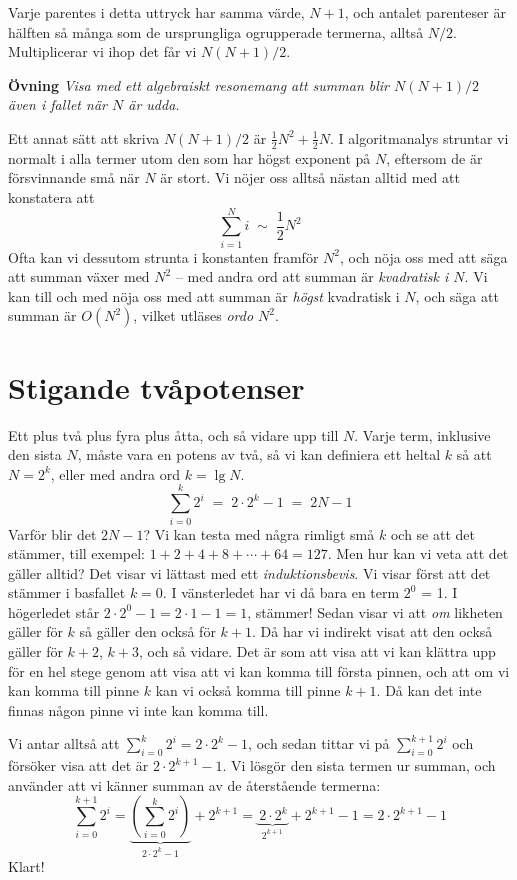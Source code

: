 \documentclass[a4paper]{article}
\begin{document}
Varje parentes i detta uttryck har samma värde, \(N+1\), och antalet parenteser är
hälften så många som de ursprungliga ogrupperade termerna, alltså \(N/2\). Multiplicerar vi ihop
det får vi \(N(N+1)/2\).

\smallskip

\noindent \textbf{Övning} \emph{Visa med ett algebraiskt resonemang att summan blir
\(N(N+1)/2\) även i fallet när \(N\) är udda.}

\smallskip

Ett annat sätt att skriva \(N(N+1)/2\) är \(\frac{1}{2}N^2 + \frac{1}{2}N\). I
algoritmanalys struntar vi normalt i alla termer utom den som har högst exponent
på \(N\), eftersom de är försvinnande små när \(N\) är stort. Vi nöjer oss
alltså nästan alltid med att konstatera att
\[\sum_{i=1}^N i \; \sim\; \frac{1}{2}N^2\]
Ofta kan vi dessutom strunta i konstanten framför \(N^2\), och nöja oss med att säga att summan
växer med \(N^2\) – med andra ord att summan är \emph{kvadratisk i \(N\)}. Vi kan till och med
nöja oss med att summan är \emph{högst} kvadratisk i \(N\), och säga att summan är
\(O(N^2)\), vilket utläses \emph{ordo \(N^2\)}.

\section*{Stigande tvåpotenser}
\label{sec:orge12075c}

Ett plus två plus fyra plus åtta, och så vidare upp till \(N\). Varje term,
inklusive den sista \(N\), måste vara en
potens av två, så vi kan definiera ett heltal \(k\) så att \(N=2^k\), eller med andra ord
\(k=\lg N\).
\[\sum_{i=0}^k 2^i \; =\; 2\cdot 2^k-1 \; =\; 2N-1\]
Varför blir det \(2N-1\)? Vi kan testa med några rimligt små \(k\) och se att det
stämmer, till exempel: \(1+2+4+8+\cdots+64 = 127\). Men hur kan vi veta att det
gäller alltid? Det visar vi lättast med ett \emph{induktionsbevis}. Vi visar först
att det stämmer i basfallet \(k=0\). I vänsterledet har vi då bara en term \(2^0\)
= 1. I högerledet står \(2\cdot 2^0-1=2\cdot 1-1=1\), stämmer! Sedan visar vi att \emph{om} likheten
gäller för \(k\) så gäller den också för \(k+1\). Då har vi indirekt visat att den
också gäller för \(k+2\), \(k+3\), och så vidare. Det är som att visa att vi kan
klättra upp för en hel stege genom att visa att vi kan komma till första pinnen,
och att om vi kan komma till pinne \(k\) kan vi också komma till pinne \(k+1\). Då
kan det inte finnas någon pinne vi inte kan komma till.

Vi antar alltså att \(\sum_{i=0}^k 2^i = 2\cdot 2^k-1\), och sedan tittar vi på
\(\sum_{i=0}^{k+1} 2^i\) och försöker visa att det är \(2\cdot 2^{k+1}-1\). Vi
lösgör den sista termen ur summan, och använder att vi känner summan av de återstående termerna:
\[\sum_{i=0}^{k+1} 2^i = \underbrace{\left(\sum_{i=0}^{k} 2^i \right)}_{2\cdot
2^k-1} \mathop+ 2^{k+1} =
\underbrace{\,2\cdot 2^k}_{2^{k+1}} \mathop+ 2^{k+1} - 1 = 2\cdot 2^{k+1}-1\]
Klart!
\end{document}
